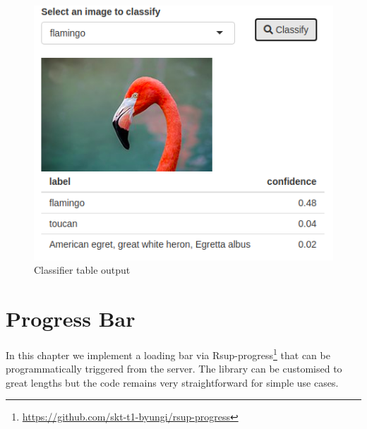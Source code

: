 \documentclass[
]{krantz}
\makeatletter
\newenvironment{Shaded}{\begin{snugshade}}{\end{snugshade}}
\newcommand{\KeywordTok}[1]{\textcolor[rgb]{0.27,0.27,0.27}{\textbf{#1}}}
\newcommand{\NormalTok}[1]{#1}
\newcommand{\OperatorTok}[1]{\textcolor[rgb]{0.43,0.43,0.43}{\textbf{#1}}}
\newcommand{\StringTok}[1]{\textcolor[rgb]{0.5,0.5,0.5}{#1}}
\renewcommand{\href}[2]{#2\footnote{\url{#1}}}
\newenvironment{kframe}{%
\medskip{}
\setlength{\fboxsep}{.8em}
 \def\at@end@of@kframe{}%
 \ifinner\ifhmode%
  \def\at@end@of@kframe{\end{minipage}}%
  \begin{minipage}{\columnwidth}%
 \fi\fi%
 \def\FrameCommand##1{\hskip\@totalleftmargin \hskip-\fboxsep
 \colorbox{shadecolor}{##1}\hskip-\fboxsep
     \hskip-\linewidth \hskip-\@totalleftmargin \hskip\columnwidth}%
 \MakeFramed {\advance\hsize-\width
   \@totalleftmargin\z@ \linewidth\hsize
   \@setminipage}}%
 {\par\unskip\endMakeFramed%
 \at@end@of@kframe}
\renewenvironment{Shaded}{\begin{kframe}}{\end{kframe}}
\makeatother
\begin{document}
\begin{Shaded}
\end{Shaded}

\begin{figure}
\centering
\includegraphics{images/ml5-table.png}
\caption{Classifier table output}
\end{figure}

\hypertarget{progress}{%
\chapter{Progress Bar}\label{progress}}

In this chapter we implement a loading bar via \href{https://github.com/skt-t1-byungi/rsup-progress}{Rsup-progress} that can be programmatically triggered from the server. The library can be customised to great lengths but the code remains very straightforward for simple use cases.
\end{document}
